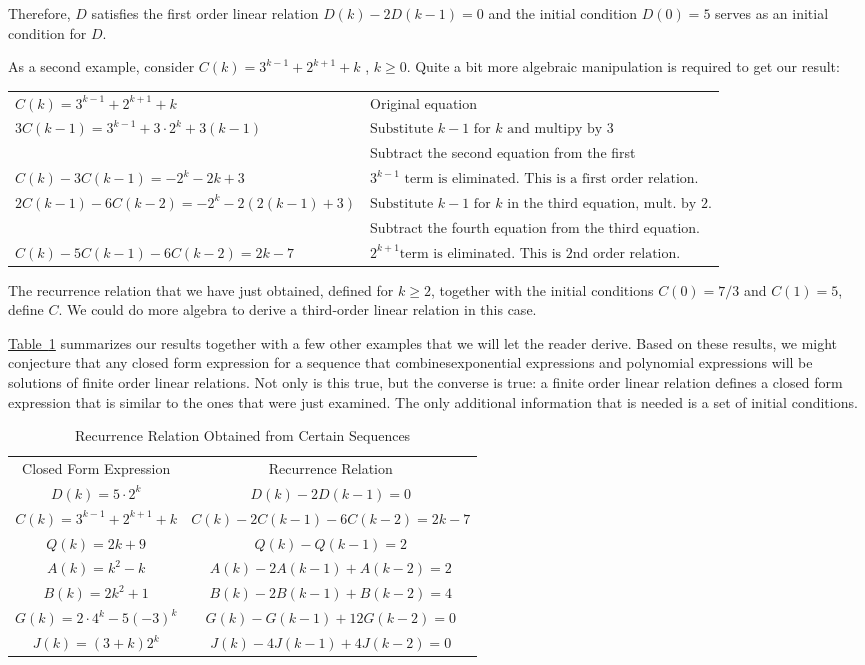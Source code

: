 \documentclass[10pt,]{book}
\theoremstyle{plain}
\theoremstyle{definition}
\theoremstyle{definition}
\theoremstyle{definition}
\theoremstyle{definition}
\numberwithin{equation}{section}
\newcommand{\hrulethick} {\noalign{\hrule height 0.11em}}
\begin{document}
Therefore, \(D\) satisfies the first order linear relation \(D(k) - 2 D(k - 1) = 0\) and the initial condition \(D(0) = 5\) serves as an initial
condition for \(D\).%
\par
As a second example, consider \(C(k) =3^{k-1}+2^{k+1}+k\) , \(k \geq  0\). Quite a bit more algebraic manipulation is required to get our result:%
\leavevmode%
\begin{table}
\centering
\begin{tabular}{ll}\hrulethick
\(C(k) =3^{k-1}+2^{k+1}+k\)&Original equation\tabularnewline[0pt]
\(3C(k-1) =3^{k-1}+3\cdot 2^k+3(k-1)\)&\( \textrm{Substitute } k-1 \textrm{ for } k \textrm{ and multipy by } 3\)\tabularnewline[0pt]
\(\)&Subtract the second equation from the first\tabularnewline[0pt]
\(C(k)-3C(k-1)=-2^k-2k+3\)&\(3^{k-1} \textrm{ term  is eliminated. This is  a  first order relation.} \)\tabularnewline[0pt]
\(2C(k-1)-6C(k-2)=-2^k-2(2(k-1)+3)\)&\(\textrm{Substitute } k-1 \textrm{ for } k \textrm{ in the third equation, mult. by 2.}\)\tabularnewline[0pt]
\(\)&Subtract the fourth equation from the third equation.\tabularnewline[0pt]
\( C(k)-5C(k-1)-6C(k-2)=2k-7\)&\(2^{k+1}\textrm{term is eliminated. This is 2nd order relation.}\)
\end{tabular}
\end{table}
\par
The recurrence relation that we have just obtained, defined for \(k \geq  2\), together with the initial conditions \(C(0) = 7/3\) and \(C(1) = 5\),
define \(C\). We could do more algebra to derive a third-order linear relation in this case.
%
\par
\hyperref[table-reverse-solutions-rr]{Table~\ref{table-reverse-solutions-rr}} summarizes our results together with a few other examples that we will let the reader derive. Based on these results, we might conjecture
that any closed form expression for a sequence that combinesexponential expressions and polynomial expressions will be solutions of finite order
linear relations. Not only is this true, but the converse is true: a finite order linear relation defines a closed form expression that is similar
to the ones that were just examined. The only additional information that is needed is a set of initial conditions.%
\leavevmode%
\begin{table}
\centering
\begin{tabular}{cc}\hrulethick
Closed Form Expression&Recurrence Relation\tabularnewline[0pt]
\(D(k)=5\cdot 2^k\)&\(D(k)-2D(k-1)=0\)\tabularnewline[0pt]
\(C(k)=3^{k-1}+2^{k+1}+k\)&\(C(k)-2C(k-1)-6C(k-2)=2k-7\)\tabularnewline[0pt]
\(Q(k)=2k + 9\)&\(Q(k)-Q(k-1)=2\)\tabularnewline[0pt]
\(A(k)=k^2-k\)&\(A(k)-2A(k-1)+A(k-2)=2\)\tabularnewline[0pt]
\(B(k)=2 k^2+1\)&\(B(k)-2B(k-1)+B(k-2)=4\)\tabularnewline[0pt]
\(G(k)=2\cdot 4^k-5(-3)^k\)&\(G(k)-G(k-1)+12G(k-2)=0\)\tabularnewline[0pt]
\(J(k)=(3+k) 2^k\)&\(J(k)-4J(k-1)+4J(k-2)=0\)
\end{tabular}
\caption{Recurrence Relation Obtained from Certain Sequences\label{table-reverse-solutions-rr}}
\end{table}
\end{document}

